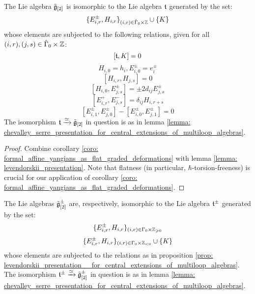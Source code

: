         \begin{proposition} \label{prop: levendorskii_presentation__for_central_extensions_of_multiloop_algebras}
            The Lie algebra $\tilde{\mathfrak{g}}_{[2]}$ is isomorphic to the Lie algebra $\mathfrak{t}$ generated by the set:
                $$\{ E_{i, r}^{\pm}, H_{i, r} \}_{(i, r) \in \hat{\Gamma}_0 \x \Z} \cup \{ K \}$$
            whose elements are subjected to the following relations, given for all $(i, r), (j, s) \in \hat{\Gamma}_0 \x \Z$:
                $$[\mathfrak{t}, K] = 0$$
                $$H_{i, 0} = h_i, E_{i, 0}^{\pm} = e_i^{\pm}$$
                $$[ H_{i, r}, H_{j, s} ] = 0$$
                $$[ H_{i, 0}, E_{j, s}^{\pm} ] = \pm 2 d_{ij} E_{j, s}^{\pm}$$
                $$[ E_{i, r}^+, E_{j, s}^- ] = \delta_{ij} H_{i, r + s}$$
                $$[ E_{i, 1}^{\pm}, E_{j, 0}^{\pm} ] - [ E_{i, 0}^{\pm}, E_{j, 1}^{\pm} ] = 0$$
            The isomorphism $\mathfrak{t} \xrightarrow[]{\simeq} \tilde{\mathfrak{g}}_{[2]}$ in question is as in lemma \ref{lemma: chevalley_serre_presentation_for_central_extensions_of_multiloop_algebras}.
        \end{proposition}
            \begin{proof}
                Combine corollary \ref{coro: formal_affine_yangians_as_flat_graded_deformations} with lemma \ref{lemma: levendorskii_presentation}. Note that flatness (in particular, $\hbar$-torsion-freeness) is crucial for our application of corollary \ref{coro: formal_affine_yangians_as_flat_graded_deformations}.
            \end{proof}
        \begin{corollary} \label{coro: levendorskii_presentation__for_central_extensions_of_multiloop_algebras}
            The Lie algebras $\tilde{\mathfrak{g}}_{[2]}^{\pm}$ are, respectively, isomorphic to the Lie algebra $\mathfrak{t}^{\pm}$ generated by the set:
                $$\{ E_{i, r}^{\pm}, H_{i, r} \}_{(i, r) \in \Gamma_0 \x \Z_{\geq 0}}$$
                $$\{ E_{i, r}^{\pm}, H_{i, r} \}_{(i, r) \in \Gamma_0 \x \Z_{< 0}} \cup \{K\}$$
            whose elements are subjected to the relations as in proposition \ref{prop: levendorskii_presentation__for_central_extensions_of_multiloop_algebras}. The isomorphism $\mathfrak{t}^{\pm} \xrightarrow[]{\simeq} \tilde{\mathfrak{g}}_{[2]}^{\pm}$ in question is as in lemma \ref{lemma: chevalley_serre_presentation_for_central_extensions_of_multiloop_algebras}.
        \end{corollary}

